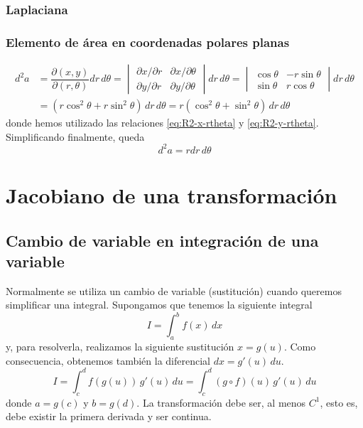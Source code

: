 \subsection{Laplaciana} 

\subsection{Elemento de área en coordenadas polares planas}
\begin{align*}
  d^2a
  &=
    \dfrac{\partial(x,y)}{\partial(r,\theta)} dr\,d\theta
  = \begin{vmatrix}
    \partial x/\partial r & \partial x/\partial\theta\\
    \partial y/\partial r & \partial y/\partial\theta
  \end{vmatrix}
  dr\,d\theta
  = \begin{vmatrix}
    \cos\theta & -r\sin\theta\\
    \sin\theta & r\cos\theta
  \end{vmatrix}
    dr\,d\theta\\
  &=
    (r\cos^2\theta + r\sin^2\theta)\,dr\,d\theta
    = r (\cos^2\theta + \sin^2\theta)\,dr\,d\theta
\end{align*}
donde hemos utilizado las relaciones \eqref{eq:R2-x-rtheta} y \eqref{eq:R2-y-rtheta}.
Simplificando finalmente, queda
\begin{equation}
  d^2a = rdr\,d\theta
\end{equation}

\chapter{Jacobiano de una transformación}
\section{Cambio de variable en integración de una variable}
Normalmente se utiliza un cambio de variable (sustitución) cuando queremos simplificar
una integral.
Supongamos que tenemos la siguiente integral
\begin{equation}
  I= \int_a^b \!f(x)\, dx
\end{equation}
y, para resolverla, realizamos la siguiente sustitución $x = g(u)$.
Como consecuencia, obtenemos también la diferencial $dx=g'(u)\,du$.
\begin{equation}
  I = \int_c^d \!f(g(u))\,g'(u)\,du = \int_c^d\!(g\circ f)(u)\,g'(u)\,du
\end{equation}
donde $a=g(c)$ y $b=g(d)$. La transformación debe ser, al menos $C^1$, esto es, debe
existir la primera derivada y ser continua.

